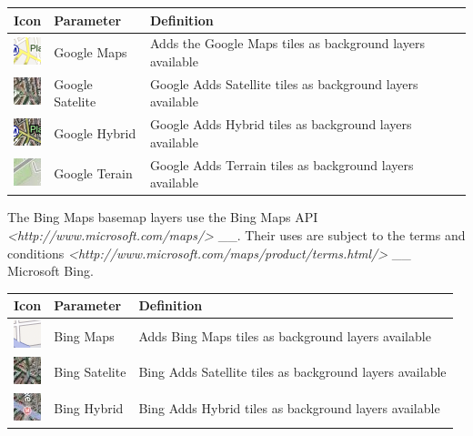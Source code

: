 \documentclass[letterpaper,10pt,english]{sphinxmanual}
\begin{document}
\begin{tabulary}{\linewidth}{|L|L|L|}
\hline

\textbf{Icon}
 & 
\textbf{Parameter}
 & 
\textbf{Definition}
\\
\hline
\includegraphics{gmap-layer-icon.png}
 & 
Google Maps
 & 
Adds the Google Maps tiles as background layers available
\\
\hline
\includegraphics{gsat-layer-icon.png}
 & 
Google Satelite
 & 
Google Adds Satellite tiles as background layers available
\\
\hline
\includegraphics{ghyb-layer-icon.png}
 & 
Google Hybrid
 & 
Google Adds Hybrid tiles as background layers available
\\
\hline
\includegraphics{gter-layer-icon.png}
 & 
Google Terain
 & 
Google Adds Terrain tiles as background layers available
\\
\hline\end{tabulary}


The Bing Maps basemap layers use the Bing Maps API \emph{\textless{}http://www.microsoft.com/maps/\textgreater{}} \_\_. Their uses are subject to the terms and conditions \emph{\textless{}http://www.microsoft.com/maps/product/terms.html/\textgreater{}} \_\_ Microsoft Bing.

\begin{tabulary}{\linewidth}{|L|L|L|}
\hline

\textbf{Icon}
 & 
\textbf{Parameter}
 & 
\textbf{Definition}
\\
\hline
\includegraphics{bstr-layer-icon.png}
 & 
Bing Maps
 & 
Adds Bing Maps tiles as background layers available
\\
\hline
\includegraphics{bsat-layer-icon.png}
 & 
Bing Satelite
 & 
Bing Adds Satellite tiles as background layers available
\\
\hline
\includegraphics{bhyb-layer-icon.png}
 & 
Bing Hybrid
 & 
Bing Adds Hybrid tiles as background layers available
\\
\hline\end{tabulary}
\end{document}
